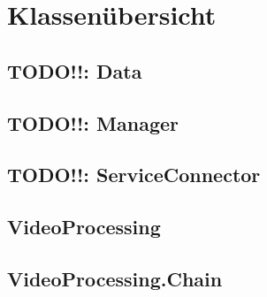 \newpage
\section{Klassenübersicht}

\subsection{TODO!!: Data}

\newpage


\newpage


\newpage

\subsection{TODO!!: Manager}

\newpage


\newpage

\subsection{TODO!!: ServiceConnector}

\newpage

\subsection{VideoProcessing}

\newpage


\newpage


\newpage


\newpage

\subsection{VideoProcessing.Chain}


\newpage


\newpage


\newpage

